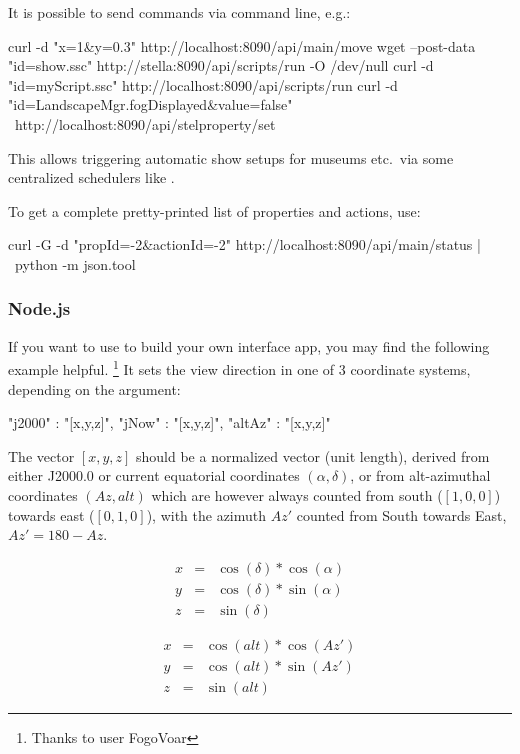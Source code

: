 It is possible to send commands via command line, e.g.:

\begin{commandsScr}
curl -d "x=1&y=0.3" http://localhost:8090/api/main/move
wget --post-data "id=show.ssc" http://stella:8090/api/scripts/run -O /dev/null
curl -d "id=myScript.ssc" http://localhost:8090/api/scripts/run
curl -d "id=LandscapeMgr.fogDisplayed&value=false" \ 
      http://localhost:8090/api/stelproperty/set
\end{commandsScr}
This allows triggering automatic show setups for museums etc.\ via  some centralized schedulers like .

To get a complete pretty-printed list of properties and actions, use:
\begin{commandsScr}
curl -G -d "propId=-2&actionId=-2" http://localhost:8090/api/main/status | \
     python -m json.tool 
\end{commandsScr} 

\subsubsection{Node.js}
\label{sec:plugins:RemoteControl:API:node.js}

If you want to use  to build your own interface app, you may find the following example helpful.%
\footnote{Thanks to user FogoVoar}
It sets the view direction in one of 3 coordinate systems, depending on the argument:

\begin{commandsScr}
    "j2000" : "[x,y,z]",
    "jNow"  : "[x,y,z]",
    "altAz" : "[x,y,z]"
\end{commandsScr}

\noindent The vector $[x, y, z]$ should be a normalized vector (unit length), derived from 
either J2000.0 or current equatorial coordinates $(\alpha, \delta)$, 
or from alt-azimuthal coordinates $(\mathit{Az}, \mathit{alt})$ which are however always counted from south ($[1,0,0]$) towards east ($[0,1,0]$), 
with the azimuth $\mathit{Az}'$ counted from South towards East, $\mathit{Az}'=180-\mathit{Az}$.

\begin{minipage}{0.3\textwidth}
\begin{align*}
x & = & \cos(\delta)*\cos(\alpha)\\
y & = & \cos(\delta)*\sin(\alpha)\\
z & = & \sin(\delta)
\end{align*}
\end{minipage}\hspace{1cm}
\begin{minipage}{0.3\textwidth}
\begin{align*}
x & = & \cos(\mathit{alt})*\cos(\mathit{Az}')\\
y & = & \cos(\mathit{alt})*\sin(\mathit{Az}')\\
z & = & \sin(\mathit{alt}) 
\end{align*}
\end{minipage}
	
